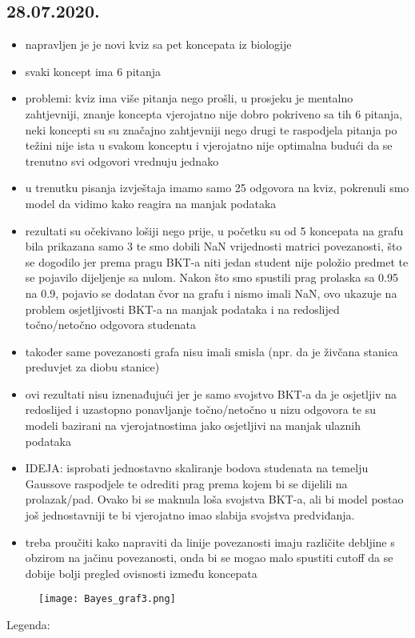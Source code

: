 		\subsection{28.07.2020.}
		\begin{itemize}
			\item napravljen je je novi kviz sa pet koncepata iz biologije
			\item svaki koncept ima 6 pitanja
			\item problemi: kviz ima više pitanja nego prošli, u prosjeku je mentalno zahtjevniji, znanje koncepta vjerojatno nije dobro pokriveno sa tih 6 pitanja, neki koncepti su su značajno zahtjevniji nego drugi te raspodjela pitanja po težini nije ista u svakom konceptu i vjerojatno nije optimalna budući da se trenutno svi odgovori vrednuju jednako
			\item u trenutku pisanja izvještaja imamo samo 25 odgovora na kviz, pokrenuli smo model da vidimo kako reagira na manjak podataka
			\item rezultati su očekivano lošiji nego prije, u početku su od 5 koncepata na grafu bila prikazana samo 3 te smo dobili NaN vrijednosti matrici povezanosti, što se dogodilo jer prema pragu BKT-a niti jedan student nije položio predmet te se pojavilo dijeljenje sa nulom. Nakon što smo spustili prag prolaska sa 0.95 na 0.9, pojavio se dodatan čvor na grafu i nismo imali NaN, ovo ukazuje na problem osjetljivosti BKT-a na manjak podataka i na redoslijed točno/netočno odgovora studenata
			\item također same povezanosti grafa nisu imali smisla (npr. da je živčana stanica preduvjet za diobu stanice)
			\item ovi rezultati nisu iznenađujući jer je samo svojstvo BKT-a da je osjetljiv na redoslijed i uzastopno ponavljanje točno/netočno u nizu odgovora te su modeli bazirani na vjerojatnostima jako osjetljivi na manjak ulaznih podataka
			\item IDEJA: isprobati jednostavno skaliranje bodova studenata na temelju Gaussove raspodjele te odrediti prag prema kojem bi se dijelili na prolazak/pad. Ovako bi se maknula loša svojstva BKT-a, ali bi model postao još jednostavniji te bi vjerojatno imao slabija svojstva predviđanja.
			\item treba proučiti kako napraviti da linije povezanosti imaju različite debljine s obzirom na jačinu povezanosti, onda bi se mogao malo spustiti cutoff da se dobije bolji pregled ovisnosti između koncepata
		\end{itemize}
		\begin{figure}[!htb]
		\centering
		\texttt{[image: Bayes\_graf3.png]}
		\caption{}
		\label{}
		\end{figure}
		Legenda:
		
